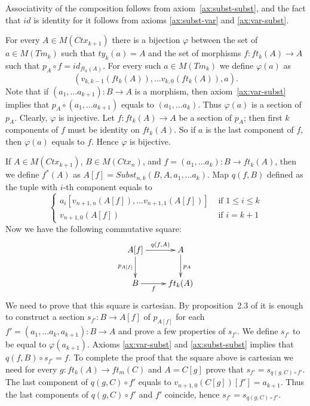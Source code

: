 \documentclass{amsart}
\theoremstyle{definition}
\theoremstyle{remark}
\numberwithin{figure}{section}
\begin{document}
Associativity of the composition follows from axiom~\eqref{ax:subst-subst}, and the fact that $id$ is identity for it follows from axioms \eqref{ax:subst-var} and \eqref{ax:var-subst}.

For every $A \in M(Ctx_{k+1})$ there is a bijection $\varphi$ between the set of $a \in M(Tm_k)$ such that $ty_k(a) = A$ and the set of morphisms $f : ft_k(A) \to A$ such that $p_A \circ f = id_{ft_k(A)}$.
For every such $a \in M(Tm_k)$ we define $\varphi(a)$ as
\[ (v_{k,k-1}(ft_k(A)), \ldots v_{k,0}(ft_k(A)), a). \]
Note that if $(a_1, \ldots a_{k+1}) : B \to A$ is a morphism, then axiom~\eqref{ax:var-subst} implies that $p_A \circ (a_1, \ldots a_{k+1})$ equals to $(a_1, \ldots a_k)$.
Thus $\varphi(a)$ is a section of $p_A$.
Clearly, $\varphi$ is injective.
Let $f : ft_k(A) \to A$ be a section of $p_A$; then first $k$ components of $f$ must be identity on $ft_k(A)$.
So if $a$ is the last component of $f$, then $\varphi(a)$ equals to $f$.
Hence $\varphi$ is bijective.

If $A \in M(Ctx_{k+1})$, $B \in M(Ctx_n)$, and $f = (a_1, \ldots a_k) : B \to ft_k(A)$, then we define $f^*(A)$ as $A[f] = Subst_{n,k}(B, A, a_1, \ldots a_k)$.
Map $q(f,B)$ defined as the tuple with $i$-th component equals to
\[ \left\{
  \begin{array}{lr}
    a_i[v_{n+1,n}(A[f]), \ldots v_{n+1,1}(A[f])] & \text{ if } 1 \leq i \leq k \\
    v_{n+1,0}(A[f])                              & \text{ if } i = k+1
  \end{array}
\right. \]
Now we have the following commutative square:
\[ \xymatrix{ A[f] \ar[r]^-{q(f,A)} \ar[d]_{p_{A[f]}} & A \ar[d]^{p_A} \\
              B \ar[r]_-f                             & ft_k(A)
            } \]
We need to prove that this square is cartesian.
By proposition~2.3 of \cite{c-systems} it is enough to construct a section $s_{f'} : B \to A[f]$ of $p_{A[f]}$ for each $f' = (a_1, \ldots a_k, a_{k+1}) : B \to A$ and prove a few properties of $s_{f'}$.
We define $s_{f'}$ to be equal to $\varphi(a_{k+1})$.
Axioms \eqref{ax:var-subst} and \eqref{ax:subst-subst} implies that $q(f, B) \circ s_{f'} = f$.
To complete the proof that the square above is cartesian we need for every $g : ft_k(A) \to ft_m(C)$ and $A = C[g]$ prove that $s_{f'} = s_{q(g,C) \circ f'}$.
The last component of $q(g,C) \circ f'$ equals to $v_{n+1,0}(C[g])[f'] = a_{k+1}$.
Thus the last components of $q(g,C) \circ f'$ and $f'$ coincide, hence $s_{f'} = s_{q(g,C) \circ f'}$.
\end{document}
